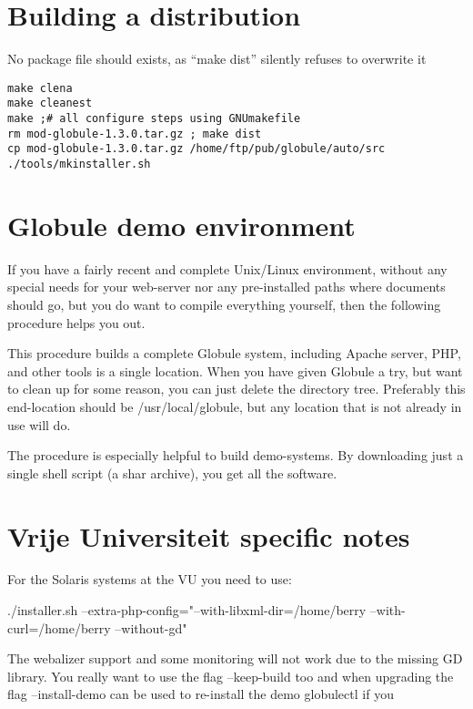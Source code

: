 \section{Building a distribution}

No package file should exists, as ``make dist'' silently refuses to overwrite
it

\begin{verbatim}
make clena
make cleanest
make ;# all configure steps using GNUmakefile
rm mod-globule-1.3.0.tar.gz ; make dist
cp mod-globule-1.3.0.tar.gz /home/ftp/pub/globule/auto/src
./tools/mkinstaller.sh
\end{verbatim}

\section{Globule demo environment}

If you have a fairly recent and complete Unix/Linux environment, without
any special needs for your web-server nor any pre-installed paths where
documents should go, but you do want to compile everything yourself, then
the following procedure helps you out.

This procedure builds a complete Globule system, including Apache server,
PHP, and other tools is a single location.  When you have given Globule
a try, but want to clean up for some reason, you can just delete the
directory tree.  Preferably this end-location should be /usr/local/globule,
but any location that is not already in use will do.

The procedure is especially helpful to build demo-systems.  By downloading
just a single shell script (a shar archive), you get all the software.


\section{Vrije Universiteit specific notes}

For the Solaris systems at the VU you need to use:

  ./installer.sh --extra-php-config="--with-libxml-dir=/home/berry --with-curl=/home/berry --without-gd"

The webalizer support and some monitoring will not work due to the missing GD
library.
You really want to use the flag --keep-build too and when upgrading the flag
--install-demo can be used to re-install the demo globulectl if you 

